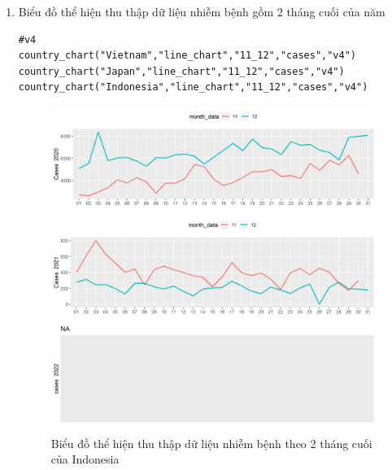 \documentclass[a4paper]{article}
\theoremstyle{definition}
\begin{document}
\begin{enumerate}[i)]
\begin{enumerate}[1)]
    \newpage
    \item Biểu đồ thể hiện thu thập dữ liệu nhiễm bệnh gồm 2 tháng cuối của năm
    \begin{lstlisting}[frame=single]  
#v4
country_chart("Vietnam","line_chart","11_12","cases","v4")
country_chart("Japan","line_chart","11_12","cases","v4")
country_chart("Indonesia","line_chart","11_12","cases","v4")
		\end{lstlisting}
		\begin{figure}[htp]
		    \centering
		    \includegraphics[scale = 0.7]{Images/V/v4 Indonesia .jpeg}
		    \caption{Biểu đồ thể hiện thu thập dữ liệu nhiễm bệnh theo 2 tháng cuối của Indonesia}
		    \label{fig:my_label}
		\end{figure}
		\begin{figure}[htp]
		    \centering

\end{figure}
\end{enumerate}
\end{enumerate}
\end{document}
